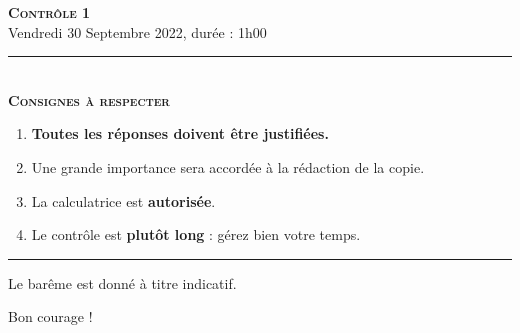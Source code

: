 \documentclass[11pt]{article}
\begin{document}

\begin{center}
\textbf{\LARGE \textsc{Contrôle 1}}\\[2mm]

{\large Vendredi 30 Septembre 2022, durée : 1h00}\\[1mm]
\noindent\rule{8cm}{0.4pt}\\[1mm]
\textbf{\textsc{Consignes à respecter}}
\begin{enumerate}[label=\textbf{\arabic*/}]
\item \textbf{Toutes les réponses doivent être justifiées.}
\item Une grande importance sera accordée à la rédaction de la
  copie.
\item La calculatrice est \textbf{autorisée}.
\item Le contrôle est \textbf{plutôt long} : gérez bien votre temps.
    \end{enumerate}
\noindent\rule{12cm}{0.4pt}
\end{center}

\vspace{2mm}
\noindent Le barême est donné à titre indicatif.
\vspace{2mm}
\begin{center}
  Bon courage !
\end{center}
\end{document}
